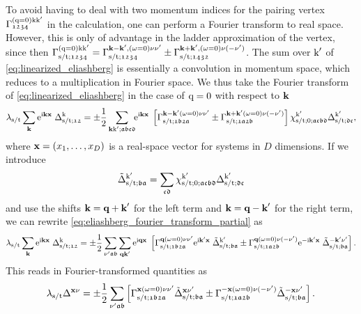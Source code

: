 \documentclass[../../main.tex]{subfiles}
\begin{document}
To avoid having to deal with two momentum indices for the pairing vertex $\Gamma_{\mathfrak{1234}}^{(\text{q}=0)\text{k}\text{k}'}$ in the calculation, one can perform a Fourier transform to real space. However, this is only of advantage in the ladder approximation of the vertex, since then $\Gamma_{\text{s}/\text{t};\mathfrak{1234}}^{(\text{q}=0)\text{k}\text{k}'}=\Gamma_{\text{s}/\text{t};\mathfrak{1234}}^{\textbf{k}-\textbf{k}',(\omega=0)\nu\nu'}\pm\Gamma_{\text{s}/\text{t};\mathfrak{1432}}^{\textbf{k}+\textbf{k}',(\omega=0)\nu(-\nu')}$. The sum over $\text{k}'$ of \eqref{eq:linearized_eliashberg} is essentially a convolution in momentum space, which reduces to a multiplication in Fourier space. We thus take the Fourier transform of \eqref{eq:linearized_eliashberg} in the case of $\text{q}=0$ with respect to $\textbf{k}$
\begin{align}\label{eq:eliashberg_fourier_transform_partial}
	\lambda_{\text{s}/\text{t}}\sum_{\textbf{k}}\text{e}^{\text{i}\textbf{kx}}\;\Delta_{\text{s}/\text{t};\mathfrak{12}}^{\text{k}}=\pm\frac{1}{2}\sum_{\textbf{k}\text{k}';\mathfrak{abcd}}\!\!\text{e}^{\text{i}\textbf{kx}}\;\left [\Gamma_{\text{s}/\text{t};\mathfrak{1b2a}}^{\textbf{k}-\textbf{k}'(\omega=0)\nu\nu'}\pm\Gamma_{\text{s}/\text{t};\mathfrak{1a2b}}^{\textbf{k}+\textbf{k}'(\omega=0)\nu(-\nu')}\right ]\chi^{\text{k}'}_{\text{s}/\text{t};0;\mathfrak{acbd}}\Delta_{\text{s}/\text{t};\mathfrak{dc}}^{\text{k}'},
\end{align}
where $\textbf{x}=(x_1,\ldots,x_D)$ is a real-space vector for systems in $D$ dimensions. If we introduce
\begin{align}
	\tilde\Delta^{\text{k}'}_{\text{s}/\text{t};\mathfrak{ba}}=\sum_{\mathfrak{cd}}\chi^{\text{k}'}_{\text{s}/\text{t};0;\mathfrak{acbd}}\Delta_{\text{s}/\text{t};\mathfrak{dc}}^{\text{k}'}
\end{align}
and use the shifts $\textbf{k}=\textbf{q}+\textbf{k}'$ for the left term and $\textbf{k}=\textbf{q}-\textbf{k}'$ for the right term, we can rewrite \eqref{eq:eliashberg_fourier_transform_partial} as
\begin{align}
	\lambda_{\text{s}/\text{t}}\sum_{\textbf{k}}\text{e}^{\text{i}\textbf{kx}}\; \Delta_{\text{s}/\text{t};\mathfrak{12}}^{\text{k}}=\pm\frac12\sum_{\nu'\mathfrak{ab}}\sum_{\textbf{q}\textbf{k}'}\text{e}^{\text{i}\textbf{qx}}\;\left [\Gamma_{\text{s}/\text{t};\mathfrak{1b2a}}^{\textbf{q}(\omega=0)\nu\nu'}\text{e}^{\text{i}\textbf{k}'\textbf{x}}\;\tilde\Delta^{\text{k}'}_{\text{s}/\text{t};\mathfrak{ba}}\pm\Gamma_{\text{s}/\text{t};\mathfrak{1a2b}}^{\textbf{q}(\omega=0)\nu(-\nu')}\text{e}^{-\text{i}\textbf{k}'\textbf{x}}\;\tilde\Delta^{-\textbf{k}'\nu'}_{\text{s}/\text{t};\mathfrak{ba}}\right ].
\end{align}
This reads in Fourier-transformed quantities as
\begin{align}
	\lambda_{\text{s}/\text{t}} \Delta^{\textbf{x}\nu}=\pm\frac12\sum_{\nu'\mathfrak{ab}}\left [\Gamma^{\textbf{x}(\omega=0)\nu\nu'}_{\text{s}/\text{t};\mathfrak{1b2a}}\tilde\Delta^{\textbf{x}\nu'}_{\text{s}/\text{t};\mathfrak{ba}}\pm\Gamma^{-\textbf{x}(\omega=0)\nu(-\nu')}_{\text{s}/\text{t};\mathfrak{1a2b}}\tilde\Delta^{-\textbf{x}\nu'}_{\text{s}/\text{t};\mathfrak{ba}}\right ].
\end{align}
\end{document}
